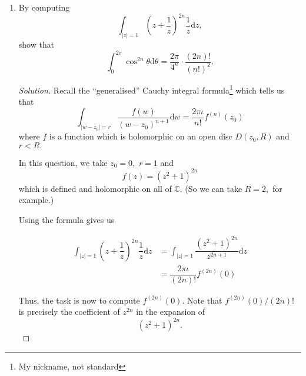\documentclass[12pt]{article}
\theoremstyle{definition}
\newenvironment{soln}{\begin{proof}[Solution]}{\end{proof}}
\begin{document}
\begin{enumerate}[leftmargin=*]
\begin{soln}
\begin{enumerate}
		Thus, we get
		\begin{align*} 
			\left|\int_{0}^{1} (1 - t)^{2N + 1}\cos^{(2N+2)}(tz){\mathrm{d}}t\right| &\le \int_{0}^{1} (1 - t)^{2N + 1}\left|\cos^{(2N + 1)}(tz)\right|{\mathrm{d}}t\\
			&\le \int_{0}^{1} (1 - t)^{2N + 1} \cosh R {\mathrm{d}}t\\
			&= \dfrac{\cosh R}{2N + 2}.
		\end{align*}
		As earlier, the desired result follows. \qedhere
		\end{enumerate}
	\end{soln}
	\item By computing
	\begin{equation*} 
		\int_{|z| = 1}^{} \left(z + \dfrac{1}{z}\right)^{2n}\dfrac{1}{z} {\mathrm{d}}z,
	\end{equation*}
	show that
	\begin{equation*} 
		\int_{0}^{2\pi} \cos^{2n}\theta {\mathrm{d}}\theta = \dfrac{2\pi}{4^n}\cdot\dfrac{(2n)!}{(n!)^2}.
	\end{equation*}
	\begin{soln}
		Recall the ``generalised'' Cauchy integral formula\footnote{My nickname, not standard} which tells us that
		\begin{equation*} 
			\int_{|w - z_0| = r}^{} \dfrac{f(w)}{(w - z_0)^{n+1}} {\mathrm{d}}w = \dfrac{2\pi\iota}{n!}f^{(n)}(z_0)
		\end{equation*}
		where $f$ is a function which is holomorphic on an open disc $D(z_0, R)$ and $r < R.$

		In this question, we take $z_0 = 0,$ $r = 1$ and
		\begin{equation*} 
			f(z) = (z^2 + 1)^{2n}
		\end{equation*}
		which is defined and holomorphic on all of $\mathbb{C}.$ (So we can take $R = 2,$ for example.)

		Using the formula gives us

		\begin{align*} 
			\int_{|z| = 1}^{} \left(z + \dfrac{1}{z}\right)^{2n}\dfrac{1}{z} {\mathrm{d}}z &= \int_{|z| = 1}^{} \dfrac{(z^2 + 1)^{2n}}{z^{2n + 1}} {\mathrm{d}}z\\
			&= \dfrac{2\pi\iota}{(2n)!}f^{(2n)}(0)
		\end{align*}

		Thus, the task is now to compute $f^{(2n)}(0).$ Note that $f^{(2n)}(0)/(2n)!$ is precisely the coefficient of $z^{2n}$ in the expansion of 
		\begin{equation*} 
			(z^2 + 1)^{2n}.
		\end{equation*}


\end{soln}
\end{enumerate}
\end{document}
